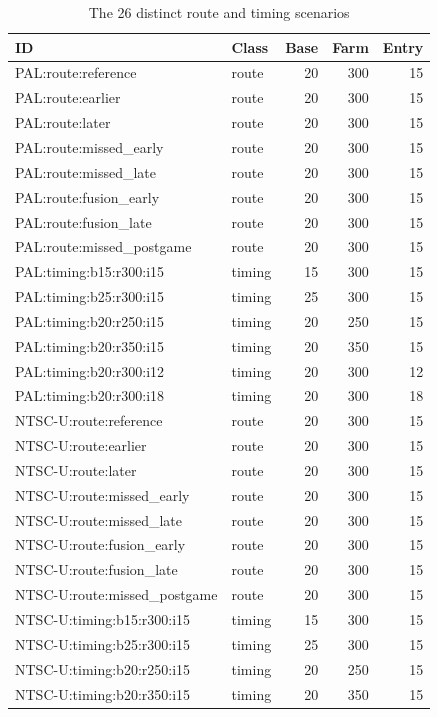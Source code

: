 \documentclass[11pt]{article}
\theoremstyle{definition}\newtheorem{definition}[theorem]{Definition}
\begin{document}
\begin{table}[H]\centering\small
\begin{tabular}{llrrr}\toprule
ID & Class & Base & Farm & Entry\\\midrule
PAL:route:reference & route & 20 & 300 & 15\\
PAL:route:earlier & route & 20 & 300 & 15\\
PAL:route:later & route & 20 & 300 & 15\\
PAL:route:missed\_early & route & 20 & 300 & 15\\
PAL:route:missed\_late & route & 20 & 300 & 15\\
PAL:route:fusion\_early & route & 20 & 300 & 15\\
PAL:route:fusion\_late & route & 20 & 300 & 15\\
PAL:route:missed\_postgame & route & 20 & 300 & 15\\
PAL:timing:b15:r300:i15 & timing & 15 & 300 & 15\\
PAL:timing:b25:r300:i15 & timing & 25 & 300 & 15\\
PAL:timing:b20:r250:i15 & timing & 20 & 250 & 15\\
PAL:timing:b20:r350:i15 & timing & 20 & 350 & 15\\
PAL:timing:b20:r300:i12 & timing & 20 & 300 & 12\\
PAL:timing:b20:r300:i18 & timing & 20 & 300 & 18\\
NTSC-U:route:reference & route & 20 & 300 & 15\\
NTSC-U:route:earlier & route & 20 & 300 & 15\\
NTSC-U:route:later & route & 20 & 300 & 15\\
NTSC-U:route:missed\_early & route & 20 & 300 & 15\\
NTSC-U:route:missed\_late & route & 20 & 300 & 15\\
NTSC-U:route:fusion\_early & route & 20 & 300 & 15\\
NTSC-U:route:fusion\_late & route & 20 & 300 & 15\\
NTSC-U:route:missed\_postgame & route & 20 & 300 & 15\\
NTSC-U:timing:b15:r300:i15 & timing & 15 & 300 & 15\\
NTSC-U:timing:b25:r300:i15 & timing & 25 & 300 & 15\\
NTSC-U:timing:b20:r250:i15 & timing & 20 & 250 & 15\\
NTSC-U:timing:b20:r350:i15 & timing & 20 & 350 & 15\\
\bottomrule\end{tabular}
\caption{The 26 distinct route and timing scenarios}\label{tab:result-6}\end{table}
\end{document}
